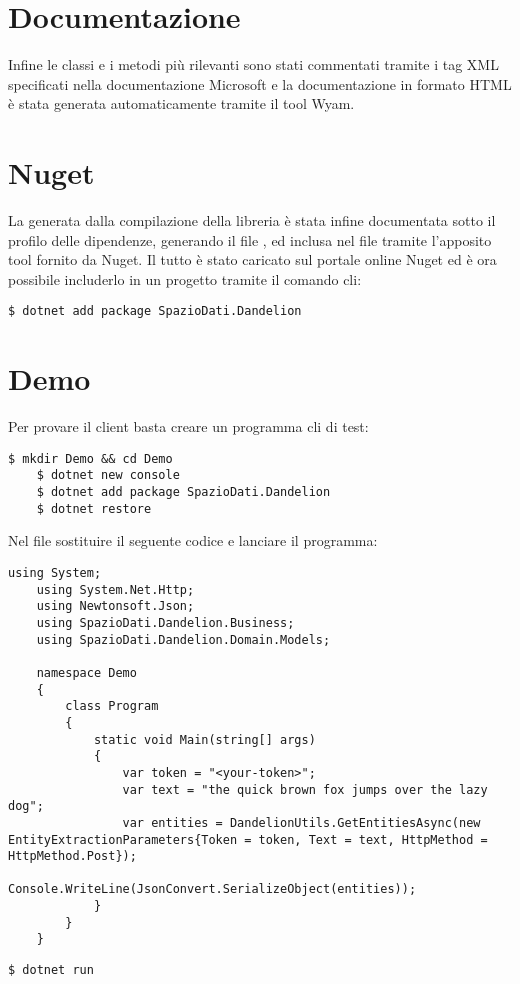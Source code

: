 \section{Documentazione}
Infine le classi e i metodi più rilevanti sono stati commentati tramite i tag XML specificati nella documentazione Microsoft e la documentazione in formato 
HTML è stata generata automaticamente tramite il tool Wyam.

\section{Nuget}
La  generata dalla compilazione della libreria è stata infine documentata sotto il profilo delle dipendenze, generando il file , ed inclusa nel file 
 tramite l'apposito tool fornito da Nuget. Il tutto è stato caricato sul portale online Nuget ed è ora possibile includerlo in un progetto tramite il comando cli:

\begin{lstlisting}[style=TexStyle, caption=Comando cli per includere il client in un progetto]    
$ dotnet add package SpazioDati.Dandelion
\end{lstlisting}

\section{Demo}
Per provare il client basta creare un programma cli di test:

\begin{lstlisting}[style=TexStyle, caption=Creazione di un progetto demo]    
    $ mkdir Demo && cd Demo
    $ dotnet new console
    $ dotnet add package SpazioDati.Dandelion
    $ dotnet restore
\end{lstlisting}

Nel file  sostituire il seguente codice e lanciare il programma:
\begin{lstlisting}[style=CSharpStyle, caption=Codice per chiamare Entity Extraction API]    
    using System;
    using System.Net.Http;
    using Newtonsoft.Json;
    using SpazioDati.Dandelion.Business;
    using SpazioDati.Dandelion.Domain.Models;
    
    namespace Demo
    {
        class Program
        {
            static void Main(string[] args)
            {
                var token = "<your-token>";
                var text = "the quick brown fox jumps over the lazy dog";
                var entities = DandelionUtils.GetEntitiesAsync(new EntityExtractionParameters{Token = token, Text = text, HttpMethod = HttpMethod.Post});
                Console.WriteLine(JsonConvert.SerializeObject(entities));
            }
        }
    }
\end{lstlisting}   

\begin{lstlisting}[style=TexStyle, caption=Compilare e lanciare il programma]    
    $ dotnet run
\end{lstlisting}

